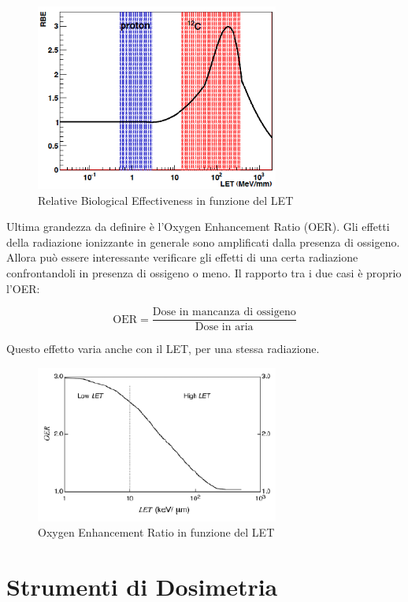 \begin{figure}
\centering
		\includegraphics[width=8cm, keepaspectratio]{figs/RBE.png}
		\caption{Relative Biological Effectiveness in funzione del LET}
         \label{RBE}
\end{figure}

Ultima grandezza da definire è l'Oxygen Enhancement Ratio (OER). Gli effetti della radiazione ionizzante in generale sono amplificati dalla presenza di ossigeno. Allora può essere interessante verificare gli effetti di una certa radiazione confrontandoli in presenza di ossigeno o meno. Il rapporto tra i due casi è proprio l'OER:

\begin{equation}
\text{OER}=\frac{\text{Dose in mancanza di ossigeno}}{\text{Dose in aria}}
\end{equation}

Questo effetto varia anche con il LET, per una stessa radiazione.

\begin{figure}
\centering
		\includegraphics[width=8cm, keepaspectratio]{figs/OER.png}
		\caption{Oxygen Enhancement Ratio in funzione del LET}
         \label{OER}
\end{figure}

\section{Strumenti di Dosimetria} 

